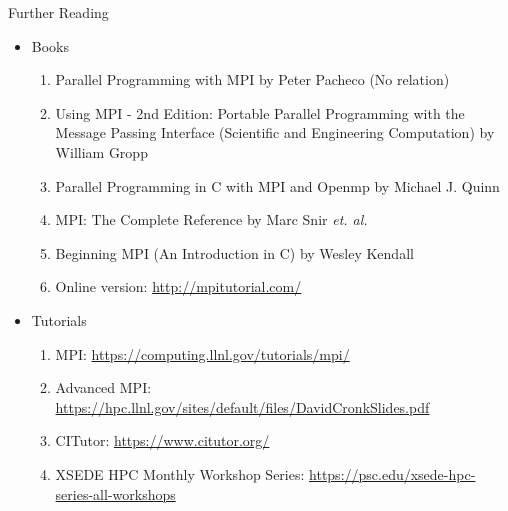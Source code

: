 \documentclass[9pt,c]{beamer}
\begin{document}
\begin{frame}{Further Reading}
  \begin{itemize}
    \item Books
    \begin{enumerate}
      \item Parallel Programming with MPI by Peter Pacheco (No relation)
      \item Using MPI - 2nd Edition: Portable Parallel Programming with the Message Passing Interface (Scientific and Engineering Computation) by William Gropp
      \item Parallel Programming in C with MPI and Openmp by Michael J. Quinn
      \item MPI: The Complete Reference by Marc Snir \textit{et. al.}
      \item Beginning MPI (An Introduction in C) by Wesley Kendall      
      \item[] Online version: \url{http://mpitutorial.com/}
    \end{enumerate}
    \item Tutorials
    \begin{enumerate}
      \item MPI: \url{https://computing.llnl.gov/tutorials/mpi/}
      \item Advanced MPI: \url{https://hpc.llnl.gov/sites/default/files/DavidCronkSlides.pdf}
      \item CITutor: \url{https://www.citutor.org/}
      \item XSEDE HPC Monthly Workshop Series: \url{https://psc.edu/xsede-hpc-series-all-workshops}
    \end{enumerate}
  \end{itemize}
\end{frame}
\end{document}
